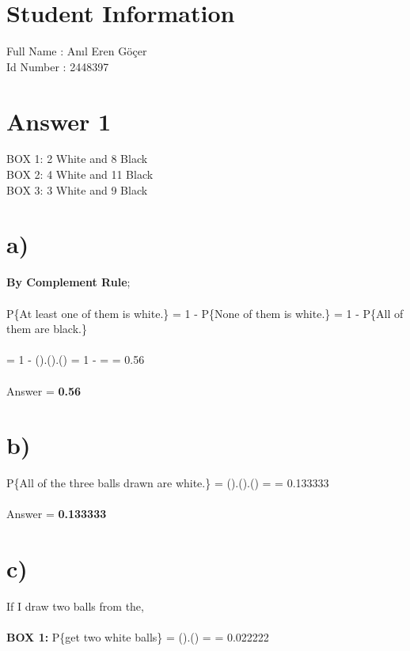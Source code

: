 \documentclass[11pt]{article}
\begin{document}
\section*{Student Information } 
Full Name :  Anıl Eren Göçer \\
Id Number :  2448397 \\

\section*{Answer 1} 
BOX 1: 2 White and 8 Black \\
BOX 2: 4 White and 11 Black \\
BOX 3: 3 White and 9 Black \\


\section*{a)}
\textbf{By Complement Rule}; \\ \\ 
P\{At least one of them is white.\} = 1 - P\{None of them is white.\} = 1 - P\{All of them are black.\} \\  \\
= 1 - ().().() = 1 -  =  = 0.56 \\ \\
Answer = \textbf{0.56}


\section*{b)}
P\{All of the three balls drawn are white.\} = ().().() =  = 0.133333 \\ \\
Answer = \textbf{0.133333}

\section*{c)}
If I draw two balls from the, \\ \\

\textbf{BOX 1:} P\{get two white balls\} = ().() =  = 0.022222 \\ \\ 
\end{document}

